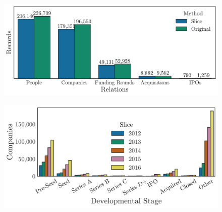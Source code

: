 \documentclass[../thesis/thesis.tex]{subfiles}
\begin{document}
\begin{figure}[!htb]
    \centering
    \includegraphics[width=\textwidth]{../figures/evaluation/2013_slice_comparison}
    \caption[Dataset slice compared with original dataset]{}
    \label{fig:evaluation:2013_slice_comparison}
\end{figure}

\begin{figure}[!htb]
    \centering
    \includegraphics[width=\textwidth]{../figures/evaluation/slice_counts_over_time}
    \caption[Dataset counts over time]{}
    \label{fig:evaluation:slice_counts_over_time}
\end{figure}

\end{document}
